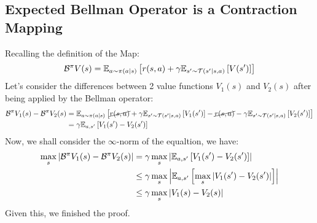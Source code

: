 \subsection{Expected Bellman Operator is a Contraction Mapping}
\label{appx:chap2-rl-expected-bell-contract}
Recalling the definition of the Map:
\begin{equation}
    \mathcal{B}^{\pi} V(s) = \mathbb{E}_{a \sim \pi(a | s)} \left[ r(s, a) + \gamma \mathbb{E}_{s' \sim \mathcal{T}(s' | s, a)}\left[ V(s') \right] \right] 
\end{equation}
Let's consider the differences between 2 value functions $V_1(s)$ and $V_2(s)$ after being applied by the Bellman operator:
\begin{equation}
\begin{aligned}
    \mathcal{B}^\pi V_1(s) - \mathcal{B}^\pi V_2(s) &= \mathbb{E}_{a \sim \pi(a | s)} \left[  \cancel{r(s, a)} + \gamma \mathbb{E}_{s' \sim \mathcal{T}(s' | s, a)}\left[ V_1(s') \right] - \cancel{r(s, a)} - \gamma \mathbb{E}_{s' \sim \mathcal{T}(s' | s, a)}\left[ V_2(s') \right]  \right] \\
    &= \gamma\mathbb{E}_{a, s'}\left[ V_1(s') - V_2(s') \right]
\end{aligned}
\end{equation}
Now, we shall consider the $\infty$-norm of the equaltion, we have:
\begin{equation}
\begin{aligned}
    \max_{s}\left|\mathcal{B}^\pi V_1(s) - \mathcal{B}^\pi V_2(s)\right| &= \gamma\max_{s}\left|\mathbb{E}_{a, s'}\left[ V_1(s') - V_2(s') \right]\right| \\
    &\le \gamma\max_{s}\left|\mathbb{E}_{a, s'}\left[ \max_s\left|V_1(s') - V_2(s')\right| \right]\right| \\
    &\le \gamma \max_{s}\left| V_1(s) - V_2(s) \right| 
\end{aligned}
\end{equation}
Given this, we finished the proof.


